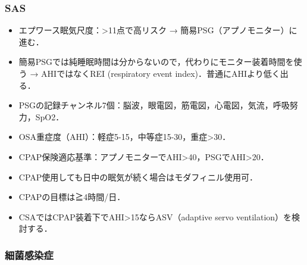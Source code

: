 \subsubsection{SAS}

\begin{itemize}
\item エプワース眠気尺度：>11点で高リスク → 簡易PSG（アプノモニター）に進む．


\item 簡易PSGでは純睡眠時間は分からないので，代わりにモニター装着時間を使う → AHIではなくREI (respiratory event index)．普通にAHIより低く出る．
\item PSGの記録チャンネル7個：脳波，眼電図，筋電図，心電図，気流，呼吸努力，SpO2．
\item OSA重症度（AHI）：軽症5-15，中等症15-30，重症>30．
\item CPAP保険適応基準：アプノモニターでAHI>40，PSGでAHI>20．
\item CPAP使用しても日中の眠気が続く場合はモダフィニル使用可．
\item CPAPの目標は≧4時間/日．
\item CSAではCPAP装着下でAHI>15ならASV（adaptive servo ventilation）を検討する．


\end{itemize}


\subsubsection{細菌感染症}

